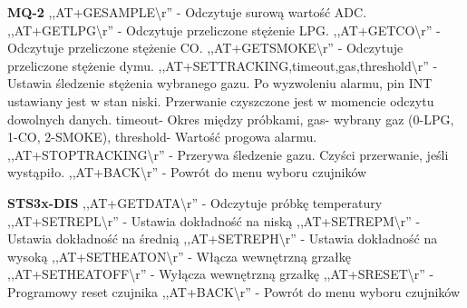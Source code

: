 \textbf{MQ-2}\newline
   ,,AT+GESAMPLE\textbackslash r'' - Odczytuje surową wartość ADC.\newline
   ,,AT+GETLPG\textbackslash r'' - Odczytuje przeliczone stężenie LPG.\newline
   ,,AT+GETCO\textbackslash r'' - Odczytuje przeliczone stężenie CO.\newline
   ,,AT+GETSMOKE\textbackslash r'' - Odczytuje przeliczone stężenie dymu.\newline
   ,,AT+SETTRACKING,\lbrack timeout\rbrack,\lbrack gas\rbrack,\lbrack threshold\rbrack\textbackslash r'' - Ustawia śledzenie stężenia wybranego gazu. Po wyzwoleniu alarmu, pin INT ustawiany jest w stan niski. Przerwanie czyszczone jest w momencie odczytu dowolnych danych. \lbrack timeout\rbrack - Okres między próbkami, \lbrack gas\rbrack - wybrany gaz (0-LPG, 1-CO, 2-SMOKE), \lbrack threshold\rbrack - Wartość progowa alarmu.\newline
   ,,AT+STOPTRACKING\textbackslash r'' - Przerywa śledzenie gazu. Czyści przerwanie, jeśli wystąpiło. \newline
   ,,AT+BACK\textbackslash r'' - Powrót do menu wyboru czujników\newline

\textbf{STS3x-DIS}\newline
   ,,AT+GETDATA\textbackslash r'' - Odczytuje próbkę temperatury\newline
   ,,AT+SETREPL\textbackslash r'' - Ustawia dokładność na niską \newline
   ,,AT+SETREPM\textbackslash r'' - Ustawia dokładność na średnią\newline
   ,,AT+SETREPH\textbackslash r'' - Ustawia dokładność na wysoką\newline
   ,,AT+SETHEATON\textbackslash r'' - Włącza wewnętrzną grzałkę\newline
   ,,AT+SETHEATOFF\textbackslash r'' - Wyłącza wewnętrzną grzałkę\newline
   ,,AT+SRESET\textbackslash r'' - Programowy reset czujnika\newline
   ,,AT+BACK\textbackslash r'' - Powrót do menu wyboru czujników\newline

